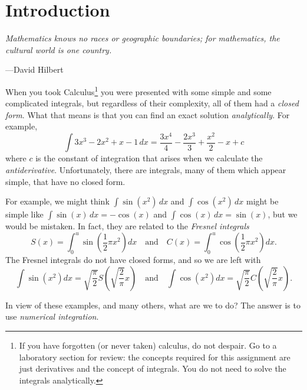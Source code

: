 \section{Introduction}


\textwidth \epigraph{\emph{Mathematics knows no races or geographic
boundaries; for mathematics, the cultural world is one country.}}{---David Hilbert}

\noindent When you took Calculus\footnote{If you have forgotten (or never taken) calculus, do not despair. Go to a
laboratory section for review: the concepts required for this assignment are
just derivatives and the concept of integrals. You do not need to solve the integrals analytically.}
you were presented with some simple
and some complicated integrals, but regardless of their complexity, all
of them had a \emph{closed form}. What that means is that you can find
an exact solution \emph{analytically}. For example,
$$
\int 3 x^3-2 x^2+x-1 \, dx =\frac{3 x^4}{4}-\frac{2 x^3}{3}+\frac{x^2}{2}-x + c
$$
where $c$ is the constant of integration that arises when we calculate
the \emph{antiderivative}. Unfortunately, there are integrals, many of
them which appear simple, that have no closed form.

For example, we might think $\int\sin(x^2)\,dx$ and $\int\cos(x^2)\,dx$ might be
simple like $\int\sin(x)\,dx=-\cos(x)$ and $\int\cos(x)\,dx=\sin(x)$,
but we would be mistaken. In fact, they are related to the
\emph{Fresnel integrals}
$$
S(x) = \int_0^u \sin(\frac{1}{2} \pi x^2) dx
\quad\text{and}\quad
C(x) = \int_0^u \cos(\frac{1}{2} \pi x^2) dx.
$$
The Fresnel integrals do not have closed forms, and so we are left with
$$
\int \sin(x^2) dx = \sqrt{\frac{\pi }{2}} S\left(\sqrt{\frac{2}{\pi }} x\right)
\quad\text{and}\quad
\int \cos(x^2) dx = \sqrt{\frac{\pi }{2}} C\left(\sqrt{\frac{2}{\pi }} x\right) .
$$

In view of these examples, and many others, what are we to do? The
answer is to use \emph{numerical integration}.
